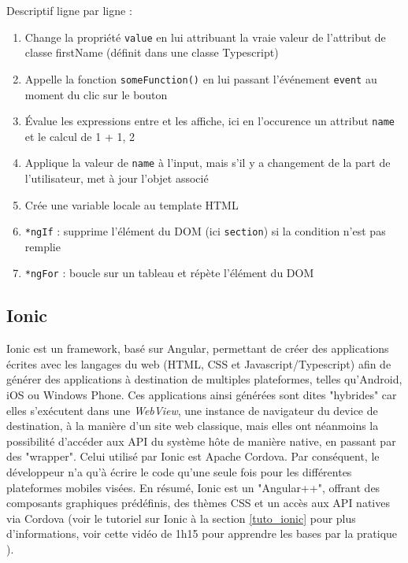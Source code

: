 \documentclass[a4paper, 12pt]{article}
\begin{document}
Descriptif ligne par ligne :
\begin{enumerate}
    \item Change la propriété \texttt{value} en lui attribuant la vraie valeur de l'attribut de classe firstName (définit dans une classe Typescript)
    \item Appelle la fonction \texttt{someFunction()} en lui passant l'événement \texttt{event} au moment du clic sur le bouton
    \item Évalue les expressions entre {} et les affiche, ici en l'occurence un attribut \texttt{name} et le calcul de 1 + 1, 2
    \item Applique la valeur de \texttt{name} à l'input, mais s'il y a changement de la part de l'utilisateur, met à jour l'objet associé
    \item Crée une variable locale au template HTML
    \item \texttt{*ngIf} : supprime l'élément du DOM (ici \texttt{section}) si la condition n'est pas remplie
    \item \texttt{*ngFor} : boucle sur un tableau et répète l'élément du DOM
\end{enumerate}

\subsection{Ionic}
Ionic est un framework, basé sur Angular, permettant de créer des applications écrites avec les langages du web (HTML, CSS et 
Javascript/Typescript) afin de générer des applications à destination de multiples plateformes, telles qu'Android, 
iOS ou Windows Phone. Ces applications ainsi générées sont dites "hybrides" car elles s'exécutent dans une 
\textit{WebView}, une instance de navigateur du device de destination, à la manière d'un site web classique, mais 
elles ont néanmoins la possibilité d'accéder aux API du système hôte de manière native, en passant par des "wrapper".
Celui utilisé par Ionic est Apache Cordova. Par conséquent, le développeur n'a qu'à écrire le code qu'une seule fois 
pour les différentes plateformes mobiles visées. En résumé, Ionic est un "Angular++", offrant des composants graphiques 
prédéfinis, des thèmes CSS et un accès aux API natives via Cordova 
(voir le tutoriel sur Ionic à la section \ref{tuto_ionic} pour plus d'informations, voir cette vidéo de 1h15 pour 
apprendre les bases par la pratique \cite{ref18}).
\end{document}
